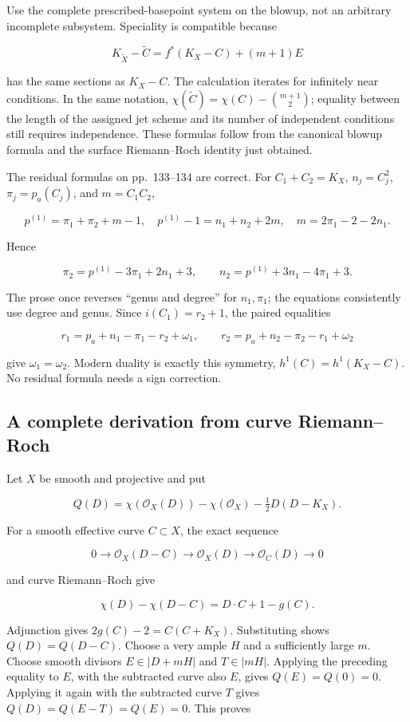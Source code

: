 Use the complete prescribed-basepoint system on the blowup, not an arbitrary incomplete subsystem. Speciality is compatible because

\[
K_{\widetilde X}-\widetilde C=f^*(K_X-C)+(m+1)E
\]

has the same sections as \(K_X-C\). The calculation iterates for infinitely near conditions. In the same notation, \(\chi(\widetilde C)=\chi(C)-\binom{m+1}{2}\); equality between the length of the assigned jet scheme and its number of independent conditions still requires independence. These formulas follow from the canonical blowup formula and the surface Riemann--Roch identity just obtained.

The residual formulas on pp.~133--134 are correct. For \(C_1+C_2=K_X\), \(n_j=C_j^2\), \(\pi_j=p_a(C_j)\), and \(m=C_1C_2\),

\[
p^{(1)}=\pi_1+\pi_2+m-1,\quad
p^{(1)}-1=n_1+n_2+2m,\quad
m=2\pi_1-2-2n_1.
\]

Hence

\[
\pi_2=p^{(1)}-3\pi_1+2n_1+3,\qquad
n_2=p^{(1)}+3n_1-4\pi_1+3.
\]

The prose once reverses ``genus and degree'' for \(n_1,\pi_1\); the equations consistently use degree and genus. Since \(i(C_1)=r_2+1\), the paired equalities

\[
r_1=p_a+n_1-\pi_1-r_2+\omega_1,\qquad
r_2=p_a+n_2-\pi_2-r_1+\omega_2
\]

give \(\omega_1=\omega_2\). Modern duality is exactly this symmetry, \(h^1(C)=h^1(K_X-C)\). No residual formula needs a sign correction.

\subsection{A complete derivation from curve Riemann--Roch}

Let \(X\) be smooth and projective and put

\[
Q(D)=\chi(\mathcal O_X(D))-\chi(\mathcal O_X)-\tfrac12D(D-K_X).
\]

For a smooth effective curve \(C\subset X\), the exact sequence

\[
0\longrightarrow\mathcal O_X(D-C)\longrightarrow\mathcal O_X(D)
\longrightarrow\mathcal O_C(D)\longrightarrow0
\]

and curve Riemann--Roch give

\[
\chi(D)-\chi(D-C)=D\cdot C+1-g(C).
\]

Adjunction gives \(2g(C)-2=C(C+K_X)\). Substituting shows \(Q(D)=Q(D-C)\). Choose a very ample \(H\) and a sufficiently large \(m\). Choose smooth divisors \(E\in|D+mH|\) and \(T\in|mH|\). Applying the preceding equality to \(E\), with the subtracted curve also \(E\), gives \(Q(E)=Q(0)=0\). Applying it again with the subtracted curve \(T\) gives \(Q(D)=Q(E-T)=Q(E)=0\). This proves

